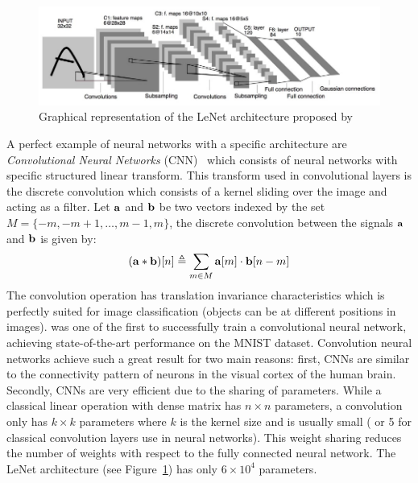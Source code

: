 \begin{figure}[htb]
  \centering
  \includegraphics[scale=0.4]{figures/chapter1/lenet.jpg}
  \caption{Graphical representation of the LeNet architecture proposed by \citet{lecun1998gradient}}
  \label{figure:lenet_network}
\end{figure}

A perfect example of neural networks with a specific architecture are \emph{Convolutional Neural Networks} (CNN)~\cite{lecun1998gradient,krizhevsky2012imagenet,He_2016_CVPR,tan2019efficientnet} which consists of neural networks with specific structured linear transform. 
This transform used in convolutional layers is the discrete convolution which consists of a kernel sliding over the image and acting as a filter.
Let $\mathbf{a}$ and $\mathbf{b}$ be two vectors indexed by the set $M = \{-m, -m+1, \dots, m-1, m\}$, the discrete convolution between the signals $\mathbf{a}$ and $\mathbf{b}$ is given by: 
\begin{equation}
  (\avec \ast \bvec) \left[ n \right] \triangleq \sum_{m \in M} \avec\left[m\right] \cdot \bvec\left[n - m\right]
\end{equation}
The convolution operation has translation invariance characteristics \cite{zhang1990parallel} which is perfectly suited for image classification (objects can be at different positions in images).  
\citet{lecun1998gradient} was one of the first to successfully train a convolutional neural network, achieving state-of-the-art performance on the MNIST dataset.
Convolution neural networks achieve such a great result for two main reasons:
first, CNNs are similar to the connectivity pattern of neurons in the visual cortex of the human brain. 
Secondly, CNNs are very efficient due to the sharing of parameters. 
While a classical linear operation with dense matrix has $n \times n$ parameters, a convolution only has $k \times k$ parameters where $k$ is the kernel size and is usually small ( or 5 for classical convolution layers use in neural networks).
This weight sharing reduces the number of weights with respect to the fully connected neural network. The LeNet architecture (see Figure~\ref{figure:lenet_network}) has only $6 \times 10^4$ parameters.  


